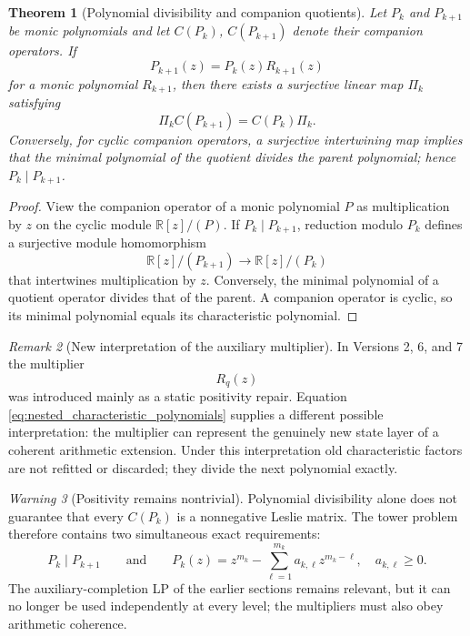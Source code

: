 \documentclass[11pt]{amsart}
\numberwithin{equation}{section}
\theoremstyle{plain}
\newtheorem{theorem}{Theorem}[section]
\theoremstyle{definition}
\theoremstyle{remark}
\newtheorem{remark}[theorem]{Remark}
\newtheorem{warning}[theorem]{Warning}
\begin{document}
\begin{theorem}[Polynomial divisibility and companion quotients]
\label{thm:companion_quotient}
Let $P_k$ and $P_{k+1}$ be monic polynomials and let $C(P_k)$,
$C(P_{k+1})$ denote their companion operators.  If
\begin{equation}
P_{k+1}(z)=P_k(z)R_{k+1}(z)
\label{eq:nested_characteristic_polynomials}
\end{equation}
for a monic polynomial $R_{k+1}$, then there exists a surjective linear map $\Pi_k$ satisfying
\[
\Pi_kC(P_{k+1})=C(P_k)\Pi_k.
\]
Conversely, for cyclic companion operators, a surjective intertwining map implies that the
minimal polynomial of the quotient divides the parent polynomial; hence
$P_k\mid P_{k+1}$.
\end{theorem}

\begin{proof}
View the companion operator of a monic polynomial $P$ as multiplication by $z$ on the cyclic
module $\mathbb R[z]/(P)$.  If $P_k\mid P_{k+1}$, reduction modulo $P_k$ defines a surjective
module homomorphism
\[
\mathbb R[z]/(P_{k+1})
\longrightarrow
\mathbb R[z]/(P_k)
\]
that intertwines multiplication by $z$.  Conversely, the minimal polynomial of a quotient
operator divides that of the parent.  A companion operator is cyclic, so its minimal polynomial
equals its characteristic polynomial.
\end{proof}

\begin{remark}[New interpretation of the auxiliary multiplier]
\label{rem:auxiliary_as_arithmetic_layer}
In Versions 2, 6, and 7 the multiplier
\[
R_q(z)
\]
was introduced mainly as a static positivity repair.  Equation
\eqref{eq:nested_characteristic_polynomials} supplies a different possible interpretation:
the multiplier can represent the genuinely new state layer of a coherent arithmetic extension.
Under this interpretation old characteristic factors are not refitted or discarded; they divide
the next polynomial exactly.
\end{remark}

\begin{warning}[Positivity remains nontrivial]
\label{warn:tower_positivity}
Polynomial divisibility alone does not guarantee that every $C(P_k)$ is a nonnegative Leslie
matrix.  The tower problem therefore contains two simultaneous exact requirements:
\[
P_k\mid P_{k+1}
\qquad\text{and}\qquad
P_k(z)=z^{m_k}-\sum_{\ell=1}^{m_k}a_{k,\ell}z^{m_k-\ell},
\quad
a_{k,\ell}\ge0.
\]
The auxiliary-completion LP of the earlier sections remains relevant, but it can no longer be
used independently at every level; the multipliers must also obey arithmetic coherence.
\end{warning}
\end{document}
